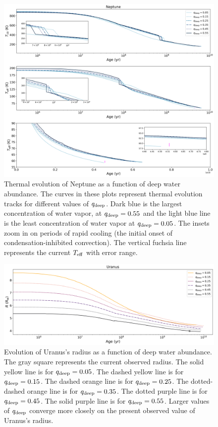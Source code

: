 \documentclass[11pt]{ucscthesisbs}
\begin{document}
\begin{figure}[ht]
 \centerline{
  \includegraphics[width=\columnwidth]{figures/n_cooling_curves_nz_4096_more_qdeeps.png}
 }
\caption[Thermal Evolution Curves for Neptune - Water Vapor Concentration Comparisons]
{Thermal evolution of Neptune as a function of deep water abundance. The curves in these plots represent thermal evolution tracks for different values of $q_{\rm deep}$. Dark blue is the largest concentration of water vapor, at $q_{\rm deep} = 0.55$ and the light blue line is the least concentration of water vapor at $q_{\rm deep} = 0.05$. The insets zoom in on periods of rapid cooling (the initial onset of condensation-inhibited convection). The vertical fuchsia line represents the current $T_{\rm eff}$ with error range.}
\label{fig:evolve_neptune_qdeeps}
\end{figure}
\begin{figure}[ht]
 \centerline{
  \includegraphics[width=\columnwidth]{figures/u_cooling_radius_nz_4096_logx_more_qdeeps.png}
 }
\caption[Thermal Evolution Curves for Uranus - Radius]
{Evolution of Uranus's radius as a function of deep water abundance. The gray square represents the current observed radius. The solid yellow line is for $q_{\rm deep} = 0.05$. The dashed yellow line is for $q_{\rm deep} = 0.15$. The dashed orange line is for $q_{\rm deep} = 0.25$. The dotted-dashed orange line is for $q_{\rm deep} = 0.35$. The dotted purple line is for $q_{\rm deep} = 0.45$. The solid purple line is for $q_{\rm deep} = 0.55$. Larger values of $q_{\rm deep}$ converge more closely on the present observed value of Uranus's radius. }
\label{fig:evolve_uranus_radius}
\end{figure}
\end{document}
